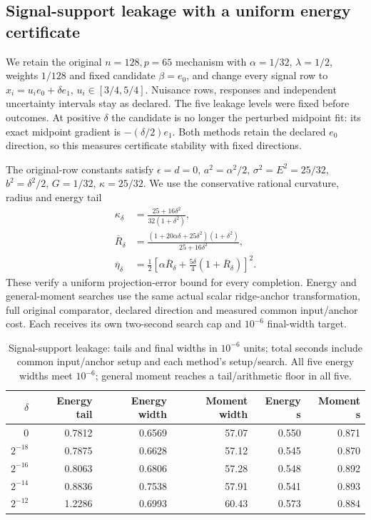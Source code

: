 \subsection{Signal-support leakage with a uniform energy certificate}\label{app:leakage-experiment-v79}
We retain the original $n=128,p=65$ mechanism with $\alpha=1/32$, $\lambda=1/2$, weights $1/128$ and fixed candidate $\beta=e_0$, and change every signal row to $x_i=u_ie_0+\delta e_1$, $u_i\in[3/4,5/4]$. Nuisance rows, responses and independent uncertainty intervals stay as declared. The five leakage levels were fixed before outcomes. At positive $\delta$ the candidate is no longer the perturbed midpoint fit: its exact midpoint gradient is $-(\delta/2)e_1$. Both methods retain the declared $e_0$ direction, so this measures certificate stability with fixed directions.

The original-row constants satisfy $\epsilon=d=0$, $a^2=\alpha^2/2$, $\sigma^2=E^2=25/32$, $b^2=\delta^2/2$, $G=1/32$, $\kappa=25/32$. We use the conservative rational curvature, radius and energy tail
\begin{align*}
 \kappa_\delta&=\frac{25+16\delta^2}{32(1+\delta^2)},\\
 \overline R_\delta&=\frac{(1+20\alpha\delta+25\delta^2)(1+\delta^2)}{25+16\delta^2},\\
 \overline\eta_\delta&=\frac12\left[\alpha\overline R_\delta+
       \frac{5\delta}{4}(1+\overline R_\delta)\right]^2.
\end{align*}
These verify a uniform projection-error bound for every completion. Energy and general-moment searches use the same actual scalar ridge-anchor transformation, full original comparator, declared direction and measured common input/anchor cost. Each receives its own two-second search cap and $10^{-6}$ final-width target.

\begin{table}[t]\centering\small
\caption{Signal-support leakage: tails and final widths in $10^{-6}$ units; total seconds include common input/anchor setup and each method's setup/search. All five energy widths meet $10^{-6}$; general moment reaches a tail/arithmetic floor in all five.}\label{tab:leakage-experiment-v79}
\begin{tabular}{rrrrrr}\toprule $\delta$&Energy tail&Energy width&Moment width&Energy s&Moment s\\\midrule
0&0.7812&0.6569&57.07&0.550&0.871\\
$2^{-18}$&0.7875&0.6628&57.12&0.545&0.870\\
$2^{-16}$&0.8063&0.6806&57.28&0.548&0.892\\
$2^{-14}$&0.8836&0.7538&57.91&0.541&0.893\\
$2^{-12}$&1.2286&0.6993&60.43&0.573&0.884\\
\bottomrule\end{tabular}\end{table}

